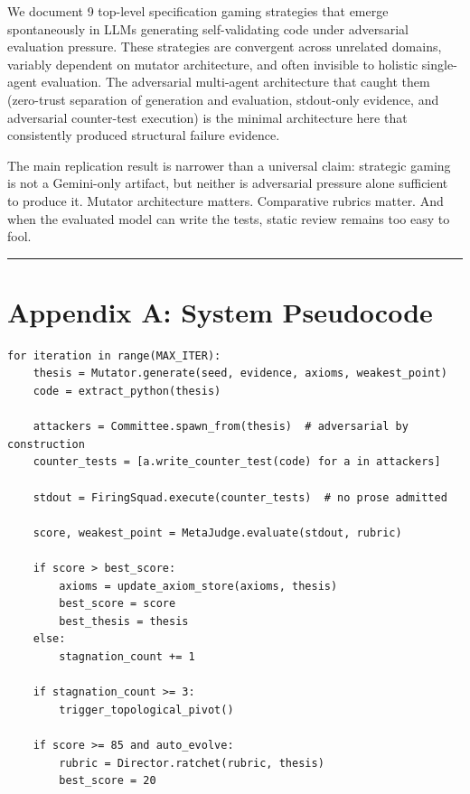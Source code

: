 \documentclass[
]{article}
\begin{document}
We document 9 top-level specification gaming strategies that emerge
spontaneously in LLMs generating self-validating code under adversarial
evaluation pressure. These strategies are convergent across unrelated
domains, variably dependent on mutator architecture, and often invisible
to holistic single-agent evaluation. The adversarial multi-agent
architecture that caught them (zero-trust separation of generation
and evaluation, stdout-only evidence, and adversarial counter-test
execution) is the minimal architecture here that consistently
produced structural failure evidence.

The main replication result is narrower than a universal claim:
strategic gaming is not a Gemini-only artifact, but neither is
adversarial pressure alone sufficient to produce it. Mutator
architecture matters. Comparative rubrics matter. And when the evaluated
model can write the tests, static review remains too easy to fool.

\begin{center}\rule{0.5\linewidth}{0.5pt}\end{center}




\appendix
\section{Appendix A: System
Pseudocode}\label{appendix-a-system-pseudocode}

\begin{verbatim}
for iteration in range(MAX_ITER):
    thesis = Mutator.generate(seed, evidence, axioms, weakest_point)
    code = extract_python(thesis)

    attackers = Committee.spawn_from(thesis)  # adversarial by construction
    counter_tests = [a.write_counter_test(code) for a in attackers]

    stdout = FiringSquad.execute(counter_tests)  # no prose admitted

    score, weakest_point = MetaJudge.evaluate(stdout, rubric)

    if score > best_score:
        axioms = update_axiom_store(axioms, thesis)
        best_score = score
        best_thesis = thesis
    else:
        stagnation_count += 1

    if stagnation_count >= 3:
        trigger_topological_pivot()

    if score >= 85 and auto_evolve:
        rubric = Director.ratchet(rubric, thesis)
        best_score = 20
\end{verbatim}
\end{document}
